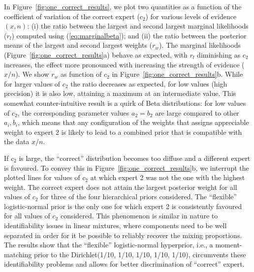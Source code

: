 \documentclass[a4paper, notitlepage, 10pt]{article}
\begin{document}
In Figure~\ref{fig:one_correct_results}, we plot two quantities as a function of the coefficient of variation of the correct expert ($c_2$) for various levels of evidence $(x, n)$: (i) the ratio between the largest and second largest marginal likelihoods ($r_l$)  computed using (\ref{eq:marginalbeta}); and (ii) the ratio between the posterior means of the largest and second largest weights ($r_w$).
The marginal likelihoods (Figure~\ref{fig:one_correct_results}a) behave as expected, with $r_l$ diminishing as $c_2$ increases, the effect more pronounced with increasing the strength of evidence ($x/n$).
We show $r_w$ as function of $c_2$ in Figure~\ref{fig:one_correct_results}b.
While for larger values of $c_2$ the ratio decreases as expected, for low values (high precision) it is also low, attaining a maximum at an intermediate value.
This somewhat counter-intuitive result is a quirk of Beta distributions: for low values of $c_2$, the corresponding parameter values $a_2 = b_2$ are large compared to other $a_i, b_i$, which means that any configuration of the weights that assigns appreciable weight to expert 2 is likely to lead to a combined prior that is compatible with the data $x/n$.

If $c_2$ is large, the ``correct'' distribution becomes too diffuse and a different expert is favoured.
To convey this in Figure~\ref{fig:one_correct_results}b, we interrupt the plotted lines for values of $c_2$ at which expert 2 was not the one with the highest weight.
The correct expert does not attain the largest posterior weight for all values of $c_2$ for three of the four hierarchical priors considered. 
The ``flexible'' logistic-normal prior is the only one for which expert 2 is consistently favoured for all values of $c_2$ considered.
This phenomenon is similar in nature to identifiability issues in linear mixtures, where components need to be well separated in order for it be possible to reliably recover the mixing proportions.
The results show that the ``flexible'' logistic-normal hyperprior, i.e., a moment-matching prior to the Dirichlet(1/10, 1/10, 1/10, 1/10, 1/10), circumvents these identifiability problems and allows for better discrimination of ``correct'' expert.
\end{document}

